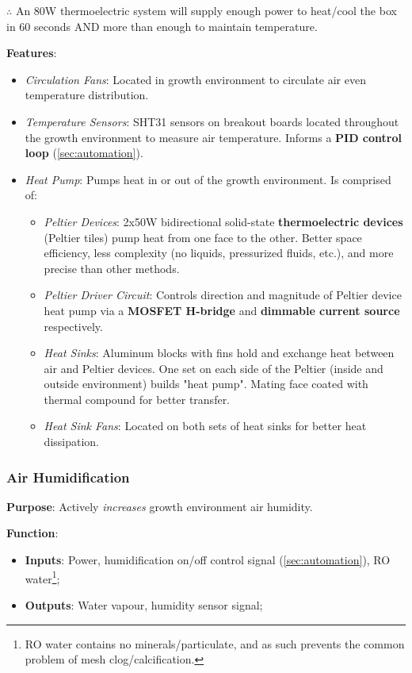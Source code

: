 \documentclass{report}
\begin{document}
$\therefore$ An 80W thermoelectric system will supply enough power to heat/cool the box in 60 seconds AND more than enough to maintain temperature.

\newpage

\textbf{Features}:
\begin{itemize}
    \item \textit{Circulation Fans}: Located in growth environment to circulate air even temperature distribution.
    \item \textit{Temperature Sensors}: SHT31 \cite{sht31} sensors on breakout boards located throughout the growth environment to measure air temperature. Informs a \textbf{PID control loop} (\ref{sec:automation}).
    \item \textit{Heat Pump}: Pumps heat in or out of the growth environment. Is comprised of:
    \begin{itemize}
        \item \textit{Peltier Devices}: 2x50W bidirectional solid-state \textbf{thermoelectric devices} (Peltier tiles) \cite{peltier} pump heat from one face to the other. Better space efficiency, less complexity (no liquids, pressurized fluids, etc.), and more precise than other methods.
        \item \textit{Peltier Driver Circuit}: Controls direction and magnitude of Peltier device heat pump via a \textbf{MOSFET H-bridge} and \textbf{dimmable current source} respectively.
        \item \textit{Heat Sinks}: Aluminum blocks with fins hold and exchange heat between air and Peltier devices. One set on each side of the Peltier (inside and outside environment) builds "heat pump". Mating face coated with thermal compound for better transfer.
        \item \textit{Heat Sink Fans}: Located on both sets of heat sinks for better heat dissipation.
    \end{itemize}
\end{itemize}

\subsubsection{Air Humidification}
\label{sec:airhum}

\textbf{Purpose}: Actively \textit{increases} growth environment air humidity.

\textbf{Function}:
\begin{itemize}
    \item \textbf{Inputs}: Power, humidification on/off control signal (\ref{sec:automation}), RO water\footnote{RO water contains no minerals/particulate, and as such prevents the common problem of mesh clog/calcification.};
    \item \textbf{Outputs}: Water vapour, humidity sensor signal;
\end{itemize}
\end{document}
